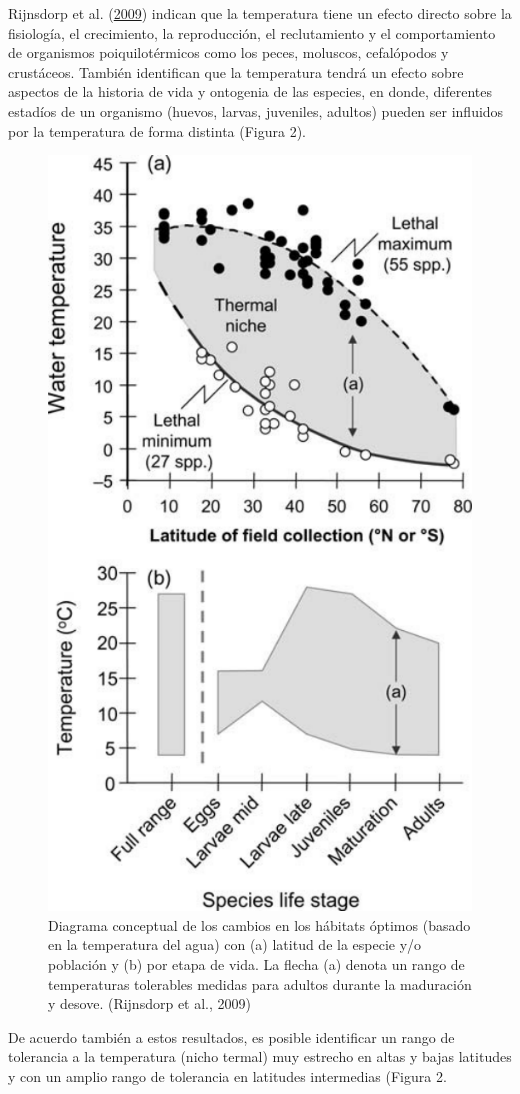 \documentclass[
]{article}
\begin{document}
Rijnsdorp et al. (\protect\hyperlink{ref-Rijnsdorp2009}{2009}) indican
que la temperatura tiene un efecto directo sobre la fisiología, el
crecimiento, la reproducción, el reclutamiento y el comportamiento de
organismos poiquilotérmicos como los peces, moluscos, cefalópodos y
crustáceos. También identifican que la temperatura tendrá un efecto
sobre aspectos de la historia de vida y ontogenia de las especies, en
donde, diferentes estadíos de un organismo (huevos, larvas, juveniles,
adultos) pueden ser influidos por la temperatura de forma distinta
(Figura 2).

\pagebreak

\begin{figure}

{\centering \includegraphics[width=0.5\linewidth]{images/Exa17} 

}

\caption{Diagrama conceptual de los cambios en los hábitats óptimos (basado en la temperatura del agua) con (a) latitud de la especie y/o población y (b) por etapa de vida. La flecha (a) denota un rango de temperaturas tolerables medidas para adultos durante la maduración y desove. (Rijnsdorp et al., 2009)}\label{fig:unnamed-chunk-2}
\end{figure}

De acuerdo también a estos resultados, es posible identificar un rango
de tolerancia a la temperatura (nicho termal) muy estrecho en altas y
bajas latitudes y con un amplio rango de tolerancia en latitudes
intermedias (Figura 2.
\end{document}
